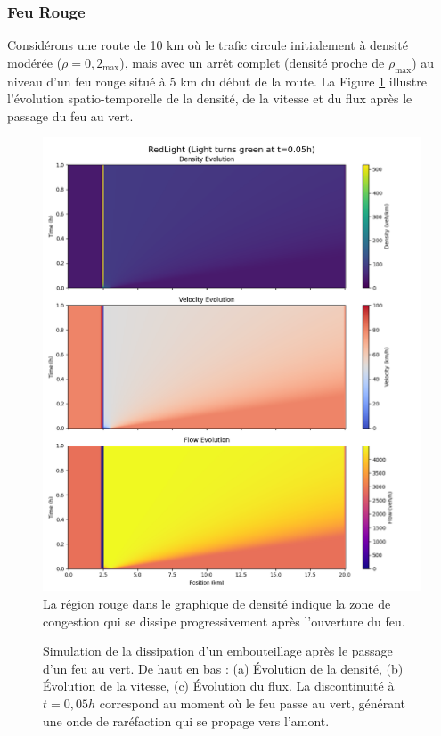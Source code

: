 \subsubsection{Feu Rouge}
\label{subsubsec:feu_rouge}

Considérons une route de 10 km où le trafic circule initialement à densité modérée ($\rho = 0,2$\rho$_{\max}$), mais avec un arrêt complet (densité proche de $\rho_{\max}$) au niveau d'un feu rouge situé à 5 km du début de la route. La Figure \ref{fig:feu_rouge} illustre l'évolution spatio-temporelle de la densité, de la vitesse et du flux après le passage du feu au vert.

\begin{figure}[htbp]
\centering
\includegraphics[width=1.0\textwidth]{simulations/LWR/redlight/redlight_(light_turns_green_at_t=0.05h).png}La région rouge dans le graphique de densité indique la zone de congestion qui se dissipe progressivement après l'ouverture du feu.
\caption{Simulation de la dissipation d'un embouteillage après le passage d'un feu au vert. De haut en bas : (a) Évolution de la densité, (b) Évolution de la vitesse, (c) Évolution du flux. La discontinuité à $t=0,05h$ correspond au moment où le feu passe au vert, générant une onde de raréfaction qui se propage vers l'amont.}
\label{fig:feu_rouge}
\end{figure}

